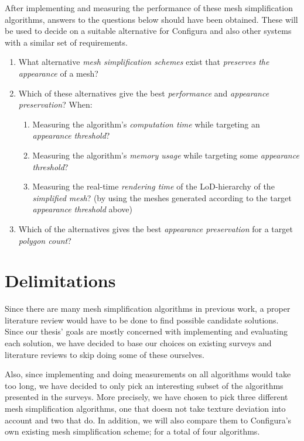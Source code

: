 After implementing and measuring the performance of these mesh simplification algorithms, answers to the questions below should have been obtained. These will be used to decide on a suitable alternative for Configura and also other systems with a similar set of requirements.

\begin{enumerate}
\item What alternative \emph{mesh simplification schemes} exist that \emph{preserves the appearance} of a mesh?

\item{Which of these alternatives give the best \emph{performance} and \emph{appearance preservation}? When:
  \begin{enumerate}
  \item Measuring the algorithm's \emph{computation time} while targeting an \emph{appearance threshold}?
  \item Measuring the algorithm's \emph{memory usage} while targeting some \emph{appearance threshold}?
  \item Measuring the real-time \emph{rendering time} of the LoD-hierarchy of the \emph{simplified mesh}?
        (by using the meshes generated according to the target \emph{appearance threshold} above)
  \end{enumerate}
}
\item Which of the alternatives gives the best \emph{appearance preservation} for a target \emph{polygon count}?
\end{enumerate}


\section{Delimitations}
\label{sec:delimitations}

Since there are many mesh simplification algorithms in previous work, a proper literature review would have to be done to find possible candidate solutions. Since our thesis' goals are mostly concerned with implementing and evaluating each solution, we have decided to base our choices on existing surveys and literature reviews to skip doing some of these ourselves.

Also, since implementing and doing measurements on all algorithms would take too long, we have decided to only pick an interesting subset of the algorithms presented in the surveys. More precisely, we have chosen to pick three different mesh simplification algorithms, one that doesn not take texture deviation into account and two that do. In addition, we will also compare them to Configura's own existing mesh simplification scheme; for a total of four algorithms.

